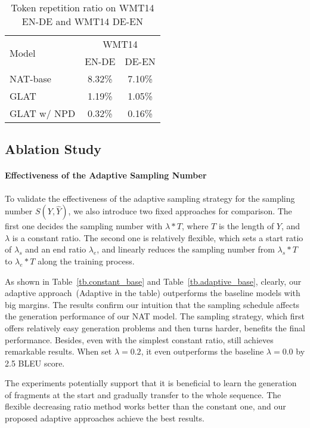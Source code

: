 \begin{table}[!tbp]
\centering
\small
\begin{tabular}{lcc}
\toprule
\multirow{2}{*}{Model} & \multicolumn{2}{c}{WMT14} \\
& EN-DE & DE-EN \\
\midrule
NAT-base & 8.32\% & 7.10\%\\
GLAT & 1.19\% & 1.05\% \\
GLAT w/ NPD & 0.32\% & 0.16\% \\
\bottomrule
\end{tabular}
\caption{Token repetition ratio on WMT14 EN-DE and WMT14 DE-EN}
\label{tb.repetition}
\end{table}

\subsection{Ablation Study}


\paragraph{Effectiveness of the Adaptive Sampling Number}
To validate the effectiveness of the adaptive sampling strategy for the sampling number $S(Y,\hat Y)$, we also introduce two fixed approaches for comparison. The first one decides the sampling number with $\lambda*T$, where $T$ is the length of $Y$, and $\lambda$ is a constant ratio. The second one is relatively flexible,  which sets a start ratio of $\lambda_s$ and an end ratio $\lambda_e$, and linearly reduces the sampling number from $\lambda_s*T$ to $\lambda_e*T$ along the training process.

As shown in Table~\ref{tb.constant_base} and Table~\ref{tb.adaptive_base}, clearly, our adaptive approach~(Adaptive in the table) outperforms the baseline models with big margins. The results confirm our intuition that the sampling schedule affects the generation performance of our NAT model.
The sampling strategy, which first offers relatively easy generation problems and then turns harder, benefits the final performance.
Besides, even with the simplest constant ratio, \method still achieves remarkable results. When set $\lambda=0.2$, it even outperforms the baseline $\lambda=0.0$ by 2.5 BLEU score.

The experiments potentially support that it is beneficial to learn the generation of fragments at the start and gradually transfer to the whole sequence. The flexible decreasing ratio method works better than the constant one, and our proposed adaptive approaches achieve the best results.

